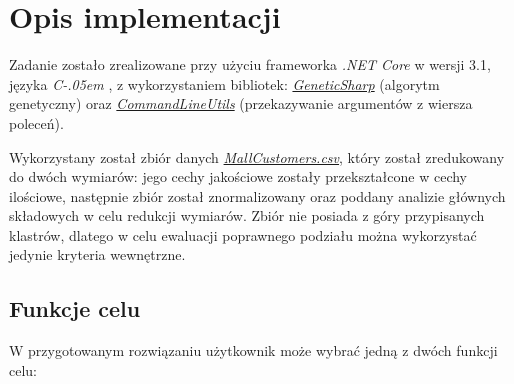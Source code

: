\documentclass{classrep}
\newcommand{\Csharp}{%
  {\settoheight{\dimen0}{C}C\kern-.05em \resizebox{!}{\dimen0}{\raisebox{\depth}{\# }}}}
\begin{document}
\section{Opis implementacji}

Zadanie zostało zrealizowane przy użyciu frameworka \textit{.NET Core} w wersji 3.1, języka \textit{\Csharp}, z wykorzystaniem bibliotek: 
\href{https://github.com/giacomelli/GeneticSharp}{
\textit{GeneticSharp}} (algorytm genetyczny) oraz \href{https://github.com/natemcmaster/CommandLineUtils}{
\textit{CommandLineUtils}} (przekazywanie argumentów z wiersza poleceń).

Wykorzystany został zbiór danych \href{https://www.kaggle.com/shwetabh123/mall-customers}{
\textit{MallCustomers.csv}}, który został zredukowany do dwóch wymiarów: jego cechy jakościowe zostały przekształcone w cechy ilościowe, następnie zbiór został znormalizowany oraz poddany analizie głównych składowych w celu redukcji wymiarów. Zbiór nie posiada z góry przypisanych klastrów, dlatego w celu ewaluacji poprawnego podziału można wykorzystać jedynie kryteria wewnętrzne.

\subsection{Funkcje celu}

W przygotowanym rozwiązaniu użytkownik może wybrać jedną z dwóch funkcji celu:
\end{document}
